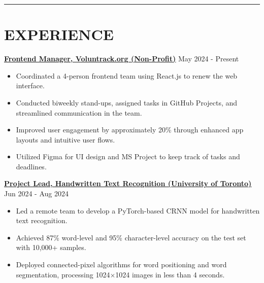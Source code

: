\documentclass[a4paper,10pt]{article}
\begin{document}
\noindent\rule{\linewidth}{1pt}

\section*{\textbf{EXPERIENCE}}

\noindent\href{https://github.com/VolunTrack/Web}{\uline{
\textbf{Frontend Manager, Voluntrack.org (Non-Profit)}}} \hfill May 2024 - Present
\begin{itemize}[leftmargin=0.2in]
    \item Coordinated a 4-person frontend team using React.js to renew the web interface.
    \item Conducted biweekly stand-ups, assigned tasks in GitHub Projects, and streamlined communication in the team.
    \item Improved user engagement by approximately 20\% through enhanced app layouts and intuitive user flows.
    \item Utilized Figma for UI design and MS Project to keep track of tasks and deadlines.
\end{itemize}

\vspace{0.3cm}
\noindent\href{https://github.com/Ken-2511/HandwritingRecognition}{\uline{
\textbf{Project Lead, Handwritten Text Recognition (University of Toronto)}}} \hfill Jun 2024 - Aug 2024
\begin{itemize}[leftmargin=0.2in]
    \item Led a remote team to develop a PyTorch-based CRNN model for handwritten text recognition.
    \item Achieved 87\% word-level and 95\% character-level accuracy on the test set with 10,000+ samples.
    \item Deployed connected-pixel algorithms for word positioning and word segmentation, processing 1024$\times$1024 images in less than 4 seconds.
\end{itemize}
\end{document}
